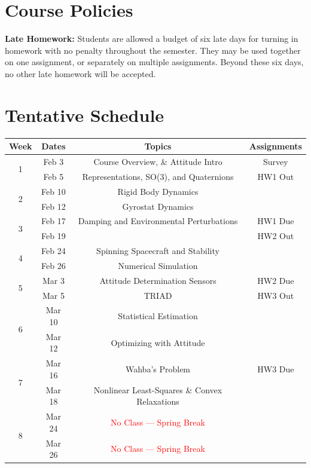 \documentclass[11pt,letterpaper]{article}
\begin{document}
\section*{Course Policies}

\textbf{Late Homework:} Students are allowed a budget of six late days for turning in homework with no penalty throughout the semester. They may be used together on one assignment, or separately on multiple assignments. Beyond these six days, no other late homework will be accepted.

\section*{Tentative Schedule}

\begin{tabular}{c|c|c|c}
	Week & Dates & Topics & Assignments \\
	\hline
	\multirow{2}{*}{1} & Feb 3 & 
        Course Overview, \& Attitude Intro & Survey \\
	 & Feb 5 & Representations, SO(3), and Quaternions &  HW1 Out\\
	\hline
	\multirow{2}{*}{2} & Feb 10 &
        Rigid Body Dynamics &  \\
	 & Feb 12 & Gyrostat Dynamics &  \\
	\hline
	\multirow{2}{*}{3} & Feb 17 &
        Damping and Environmental Perturbations & HW1 Due \\
	 & Feb 19 &  & HW2 Out \\
	\hline
	\multirow{2}{*}{4}  & Feb 24 &
        Spinning Spacecraft and Stability &  \\
	 & Feb 26 & Numerical Simulation &  \\
	\hline
	\multirow{2}{*}{5}  & Mar 3 &  Attitude Determination Sensors & HW2 Due \\
	 & Mar 5 & TRIAD & HW3 Out \\
	\hline
	\multirow{2}{*}{6}  & Mar 10 & Statistical Estimation &  \\
	 & Mar 12 & Optimizing with Attitude &  \\
	\hline
	\multirow{2}{*}{7}  & Mar 16 & Wahba's Problem
         & HW3 Due \\
	 & Mar 18 & Nonlinear Least-Squares \& Convex Relaxations & \\
	\hline
	\multirow{2}{*}{8}  & Mar 24 & 
        \textcolor{red}{No Class --- Spring Break} & \\
	 & Mar 26 & \textcolor{red}{No Class --- Spring Break} &   \\

\end{tabular}
\end{document}
